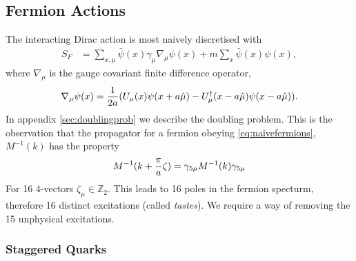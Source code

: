 \subsection{Fermion Actions}

The interacting Dirac action is most naively discretised with
\begin{align}
 S_F &= \sum_{x,\mu} \bar{\psi}(x) \gamma_{\mu} \nabla_{\mu} \psi(x) + m\sum_x \bar{\psi}(x) \psi(x),
 \label{eq:naivefermions}
\end{align}
where $\nabla_{\mu}$ is the gauge covariant finite difference operator,
\begin{align}	
	\nabla_{\mu} \psi(x) = {1\over 2a} ( U_{\mu} (x) \psi(x+a\hat{\mu}) - U^{\dagger}_{\mu}(x-a\hat{\mu})\psi(x-a\hat{\mu}) ).
\label{eq:lat_derivative}
\end{align}
In appendix \ref{sec:doublingprob} we describe the doubling problem. This is the observation that the propagator for a fermion obeying \eqref{eq:naivefermions}, $M^{-1}(k)$ has the property
\begin{align}
	M^{-1}(k+{\pi\over a}\zeta) = \gamma_{5\mu} M^{-1}(k) \gamma_{5\mu}
\end{align}
For 16 4-vectors $\zeta_{\mu} \in \mathbb{Z}_2$. This leads to 16 poles in the fermion specturm, therefore 16 distinct excitations (called \textit{tastes}). We require a way of removing the 15 unphysical excitations.

\subsubsection{Staggered Quarks}


